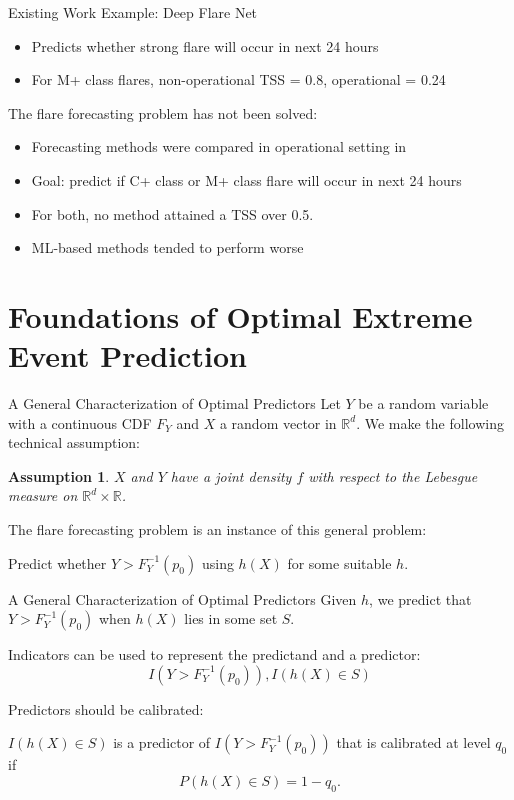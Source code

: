 \documentclass{beamer}
\newtheorem{assumption}{Assumption}[section]
\def\R{\mathbb R}
\begin{document}
\begin{frame}{Existing Work}
    Example: Deep Flare Net \cite{nishizuka2018deep, nishizuka2021oper}
    \begin{itemize}
        \item Predicts whether strong flare will occur in next 24 hours
        \item For M+ class flares, non-operational TSS = 0.8, operational = 0.24
    \end{itemize}    
    The flare forecasting problem has not been solved:
    \begin{itemize}
        \item Forecasting methods were compared in operational setting in \cite{leka2019acomII, leka2019acomIII}
        \item Goal: predict if C+ class or M+ class flare will occur in next 24 hours
        \item For both, no method attained a TSS over 0.5.
        \item ML-based methods tended to perform worse
    \end{itemize}
\end{frame}

\section{Foundations of Optimal Extreme Event Prediction}

\begin{frame}{A General Characterization of Optimal Predictors}
    Let $Y$ be a random variable with a continuous CDF $F_Y$ and $X$ a random vector in $\R^d$. We make the following technical assumption:
    \begin{assumption}\label{assump:joint_dens}
        $X$ and $Y$ have a joint density $f$ with respect to the Lebesgue measure on $\R^d \times \mathbb{R}$.
    \end{assumption}
    The flare forecasting problem is an instance of this general problem:
    \begin{center}
        Predict whether $Y > F_Y^{-1}(p_0)$ using $h(X)$ for some suitable $h$.
    \end{center}
\end{frame}

\begin{frame}{A General Characterization of Optimal Predictors}
    Given $h$, we predict that $Y > F_Y^{-1}(p_0)$ when $h(X)$ lies in some set $S$.

    Indicators can be used to represent the predictand and a predictor:
    \[
    I(Y > F_Y^{-1}(p_0)), I(h(X) \in S)
    \]

    Predictors should be calibrated:
    \begin{definition}
        $I(h(X) \in S)$ is a predictor of $I(Y > F_Y^{-1}(p_0))$ that is calibrated at level $q_0$ if 
        \[
        P(h(X) \in S) = 1 - q_0.
        \]
    \end{definition}
\end{frame}
\end{document}
